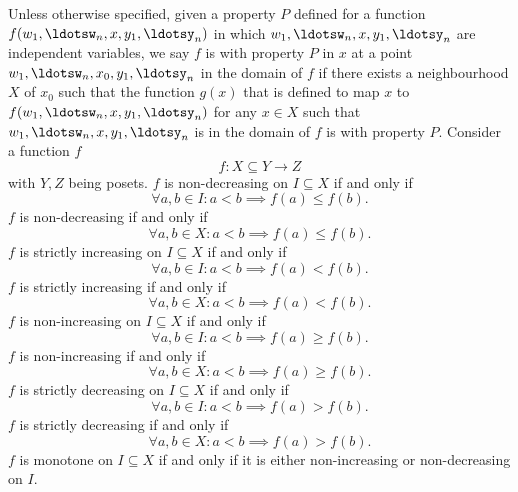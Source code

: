 \documentclass[a4paper,12pt]{report}
\begin{document}
Unless otherwise specified, given a property $P$ defined for a function $f(w_1,\ldotsw_n,x,y_1,\ldotsy_n)$ in which $w_1,\ldotsw_n,x,y_1,\ldotsy_n$ are independent variables, we say $f$ is with property $P$ in $x$ at a point $w_1,\ldotsw_n,x_0,y_1,\ldotsy_n$ in the domain of $f$ if there exists a neighbourhood $X$ of $x_0$ such that the function $g(x)$ that is defined to map $x$ to $f(w_1,\ldotsw_n,x,y_1,\ldotsy_n)$ for any $x\in X$ such that $w_1,\ldotsw_n,x,y_1,\ldotsy_n$ is in the domain of $f$ is with property $P$.
Consider a function $f$
\[f\colon X\subseteq Y\to Z\]
with $Y,Z$ being posets.
$f$ is non-decreasing on $I\subseteq X$ if and only if
\[\forall a,b\in I\colon a<b\implies f(a)\leq f(b).\]
$f$ is non-decreasing if and only if
\[\forall a,b\in X\colon a<b\implies f(a)\leq f(b).\]
$f$ is strictly increasing on $I\subseteq X$ if and only if
\[\forall a,b\in I\colon a<b\implies f(a)<f(b).\]
$f$ is strictly increasing if and only if
\[\forall a,b\in X\colon a<b\implies f(a)<f(b).\]
$f$ is non-increasing on $I\subseteq X$ if and only if
\[\forall a,b\in I\colon a<b\implies f(a)\geq f(b).\]
$f$ is non-increasing if and only if
\[\forall a,b\in X\colon a<b\implies f(a)\geq f(b).\]
$f$ is strictly decreasing on $I\subseteq X$ if and only if
\[\forall a,b\in I\colon a<b\implies f(a)>f(b).\]
$f$ is strictly decreasing if and only if
\[\forall a,b\in X\colon a<b\implies f(a)>f(b).\]
$f$ is monotone on $I\subseteq X$ if and only if it is either non-increasing or non-decreasing on $I$.
\end{document}
